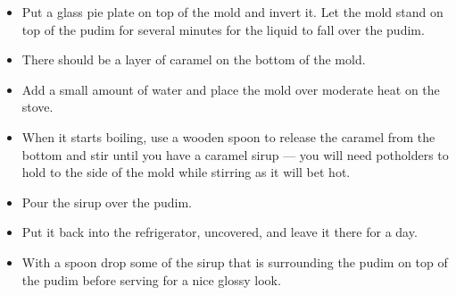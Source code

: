 \documentclass [11pt, letterpaper] {article}
\newcommand \fileName {PudimDeLeite}
\begin{document}
\begin{description}
\begin{enumerate}
\begin{itemize}
	\item Put a glass pie plate on top of the mold and invert it. Let the mold stand on top of the pudim for several minutes for the liquid to fall over the pudim.
	\item There should be a layer of caramel on the bottom of the mold.
	\item Add a small amount of water and place the mold over moderate heat on the stove.
	\item When it starts boiling, use a wooden spoon to release the caramel from the bottom and stir until you have a caramel sirup --- you will need potholders to hold to the side of the mold while stirring as it will bet hot.
	\item Pour the sirup over the pudim.
	\item Put it back into the refrigerator, uncovered, and leave it there for a day.
	\item With a spoon drop some of the sirup that is surrounding the pudim on top of the pudim before serving for a nice glossy look.
	\end{itemize}
	\end{enumerate}
\end{description}


\end{document}
